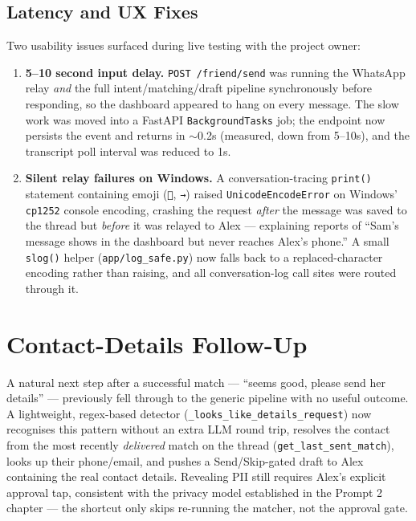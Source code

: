 \documentclass[12pt, a4paper]{report}
\begin{document}
\subsection{Latency and UX Fixes}
\label{sec:latency-fix}

Two usability issues surfaced during live testing with the project owner:

\begin{enumerate}[itemsep=3pt]
    \item \textbf{5--10 second input delay.} \texttt{POST /friend/send} was running the WhatsApp relay \emph{and} the full intent/matching/draft pipeline synchronously before responding, so the dashboard appeared to hang on every message. The slow work was moved into a FastAPI \texttt{BackgroundTasks} job; the endpoint now persists the event and returns in $\sim$0.2s (measured, down from 5--10s), and the transcript poll interval was reduced to 1s.
    \item \textbf{Silent relay failures on Windows.} A conversation-tracing \texttt{print()} statement containing emoji (\texttt{💬}, \texttt{→}) raised \texttt{UnicodeEncodeError} on Windows' \texttt{cp1252} console encoding, crashing the request \emph{after} the message was saved to the thread but \emph{before} it was relayed to Alex --- explaining reports of ``Sam's message shows in the dashboard but never reaches Alex's phone.'' A small \texttt{slog()} helper (\texttt{app/log\_safe.py}) now falls back to a replaced-character encoding rather than raising, and all conversation-log call sites were routed through it.
\end{enumerate}

\section{Contact-Details Follow-Up}

A natural next step after a successful match --- ``seems good, please send her details'' --- previously fell through to the generic pipeline with no useful outcome. A lightweight, regex-based detector (\texttt{\_looks\_like\_details\_request}) now recognises this pattern without an extra LLM round trip, resolves the contact from the most recently \emph{delivered} match on the thread (\texttt{get\_last\_sent\_match}), looks up their phone/email, and pushes a Send/Skip-gated draft to Alex containing the real contact details. Revealing PII still requires Alex's explicit approval tap, consistent with the privacy model established in the Prompt 2 chapter --- the shortcut only skips re-running the matcher, not the approval gate.
\end{document}
